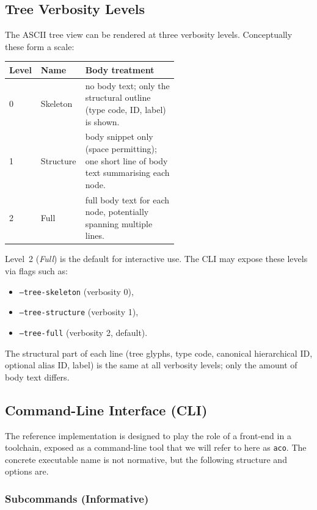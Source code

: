 \documentclass[11pt]{article}
\begin{document}
\subsection*{Tree Verbosity Levels}

The ASCII tree view can be rendered at three verbosity levels. Conceptually these form a scale:

\begin{center}
\begin{tabular}{llp{0.55\linewidth}}
\textbf{Level} & \textbf{Name}     & \textbf{Body treatment} \\
\hline
0 & Skeleton  & no body text; only the structural outline (type code, ID, label) is shown. \\
1 & Structure & body snippet only (space permitting); one short line of body text summarising each node. \\
2 & Full      & full body text for each node, potentially spanning multiple lines. \\
\end{tabular}
\end{center}

Level~2 (\emph{Full}) is the default for interactive use. The CLI may expose these levels via flags such as:

\begin{itemize}[leftmargin=2em]
  \item \texttt{--tree-skeleton} (verbosity 0),
  \item \texttt{--tree-structure} (verbosity 1),
  \item \texttt{--tree-full} (verbosity 2, default).
\end{itemize}

The structural part of each line (tree glyphs, type code, canonical hierarchical ID, optional alias ID, label) is the same at all verbosity levels; only the amount of body text differs.

\subsection*{Command-Line Interface (CLI)}

The reference implementation is designed to play the role of a front-end in a toolchain, exposed as a command-line tool that we will refer to here as \texttt{aco}. The concrete executable name is not normative, but the following structure and options are.

\subsubsection*{Subcommands (Informative)}
\end{document}
